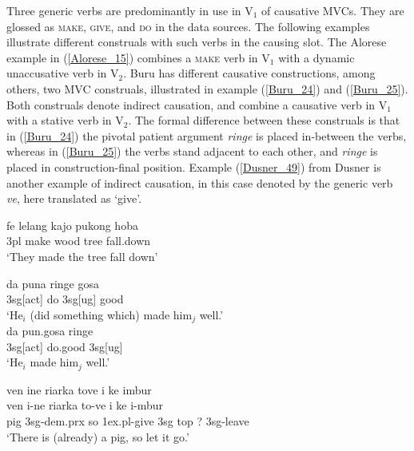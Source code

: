 Three generic verbs are predominantly in use in V$_1$ of causative MVCs. They are glossed as \textsc{make}, \textsc{give}, and \textsc{do} in the data sources. The following examples illustrate different construals with such verbs in the causing slot. The Alorese example in (\ref{Alorese_15}) combines a \textsc{make} verb in V$_1$ with a dynamic unaccusative verb in V$_2$. Buru has different causative constructions, among others, two MVC construals, illustrated in example (\ref{Buru_24}) and (\ref{Buru_25}). Both construals denote indirect causation, and combine a causative verb in V$_1$ with a stative verb in V$_2$. The formal difference between these construals is that in (\ref{Buru_24}) the pivotal patient argument \textit{ringe} is placed in-between the verbs, whereas in (\ref{Buru_25}) the verbs stand adjacent to each other, and \textit{ringe} is placed in construction-final position. Example (\ref{Dusner_49}) from Dusner is another example of indirect causation, in this case denoted by the generic verb \textit{ve}, here translated as `give'. 

\ea \label{Alorese_15}
\gll fe lelang kajo pukong hoba \\
3\acs{pl} make wood tree fall.down \\
\glft `They made the tree fall down' \\ 
\z
\xe

\pex 
\a \label{Buru_24}
\gll da puna ringe gosa \\
3\acs{sg}[\acs{act}] do 3\acs{sg}[\acs{ug}] good \\
\glft `He$_i$ (did something which) made him$_j$ well.' \\ 
\z
\a \label{Buru_25}
\gll da pun.gosa ringe \\ 
3\acs{sg}[\acs{act}] do.good 3\acs{sg}[\acs{ug}] \\
\glft `He$_i$ made him$_j$ well.' \\ 
\z
\xe

\ea \label{Dusner_49}
\gll ven ine riarka tove i ke imbur \\
ven i-ne riarka to-ve i ke i-mbur \\
\glc pig 3\acs{sg}-\acs{dem}.\acs{prx} so 1\acs{ex}.\acs{pl}-give 3\acs{sg} \acs{top} ? 3\acs{sg}-leave \\
\glft `There is (already) a pig, so let it go.' \\ 
\z
\xe


